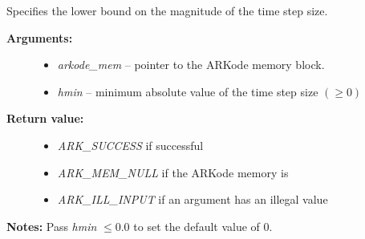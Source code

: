 \documentclass[letterpaper,10pt,english]{sphinxmanual}
\begin{document}
\begin{fulllineitems}
\label{c_interface/User_callable:ARKodeSetMinStep}
Specifies the lower bound on the magnitude of the time step size.
\begin{description}
\item[{\textbf{Arguments:}}] \leavevmode\begin{itemize}
\item {} 
\emph{arkode\_mem} -- pointer to the ARKode memory block.

\item {} 
\emph{hmin} -- minimum absolute value of the time step size $(\ge 0)$

\end{itemize}

\item[{\textbf{Return value:}}] \leavevmode\begin{itemize}
\item {} 
\emph{ARK\_SUCCESS} if successful

\item {} 
\emph{ARK\_MEM\_NULL} if the ARKode memory is 

\item {} 
\emph{ARK\_ILL\_INPUT} if an argument has an illegal value

\end{itemize}

\end{description}

\textbf{Notes:} Pass \emph{hmin} $\le 0.0$ to set the default value of 0.

\end{fulllineitems}

\end{document}
